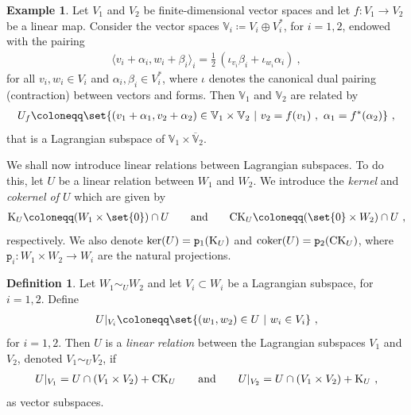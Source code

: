 \documentclass[a4paper, reqno, 11pt]{amsart}
\numberwithin{equation}{section}
\theoremstyle{definition}
\newtheorem{definition}[equation]{Definition}
\newtheorem{example}[equation]{Example}
\newcommand{\ip}[1]{\langle #1 \rangle}
\newcommand{\rmp}{\mathtt{p}}
\newcommand{\IV}{\mathbb{V}}
\theoremstyle{remark}
\begin{document}
\begin{example}\label{ex:natural}
    Let $V_1$ and $V_2$ be finite-dimensional vector spaces and let $f \colon V_1 \to V_2$ be a linear map. Consider the vector spaces $\IV_i \coloneqq V_i \oplus V^*_i$, for $i=1,2$, endowed with the pairing 
    \begin{align}
    \ip{v_i + \alpha_i, w_i+ \beta_i}_i = \tfrac12\,(\iota_{v_i} \beta_i + \iota_{w_i} \alpha_i) \ ,
    \end{align}
    for all $v_i, w_i \in V_i$ and $\alpha_i, \beta_i \in V^*_i$, where $\iota$ denotes the canonical dual pairing (contraction) between vectors and forms. Then $\IV_1$ and $\IV_2$ are related by
    \begin{align}
        U_f \coloneqq \set{(v_1+\alpha_1, v_2+ \alpha_2) \in \IV_1 \times \IV_2 \, \, \vert \, \, v_2 = f(v_1) \ , \ \alpha_1 = f^*(\alpha_2)  } \ ,
    \end{align}
    that is a Lagrangian subspace of $\IV_1 \times \overline{\IV}_2$.
\end{example}

We shall now introduce linear relations between Lagrangian subspaces. To do this, let $U$ be a linear relation between $W_1$ and $W_2$. We introduce the \emph{kernel} and \emph{cokernel of $U$} which are  given by
\begin{align} \label{eqn:KandCK}
    {\rm K}_U \coloneqq (W_1 \times \set{0}) \cap U  \qquad \text{and} \qquad {\rm CK}_U \coloneqq (\set{0} \times W_2) \cap U \ ,
\end{align}
respectively. We also denote $\ker(U) = \rmp_1({\rm K}_U)$ and ${\rm coker}(U) = \rmp_2({\rm CK}_U)$, where $\rmp_i \colon W_1 \times W_2 \to W_i$ are the natural projections.

\begin{definition}\label{def:linearlagrel}
Let  $W_1 \sim_U W_2$ and let $V_i \subset W_i$ be a Lagrangian subspace, for $i=1,2$. Define
  \begin{align}
      U \rvert_{V_i} \coloneqq \set{(w_1, w_2) \in U \  \rvert  \ w_i \in V_i } \ ,
  \end{align}
for $i=1,2.$ Then $U$ is a \emph{linear relation} between the Lagrangian subspaces $V_1$ and $V_2$, denoted $V_1 \sim_U V_2$, if 
  \begin{align}
      U \rvert_{V_1} = U\cap (V_1 \times V_2) + {\rm CK}_U \qquad \text{and} \qquad
     U \rvert_{V_2} = U\cap (V_1 \times V_2) + {\rm K}_U \ ,
 \end{align}
as  vector subspaces.
\end{definition}
\end{document}
